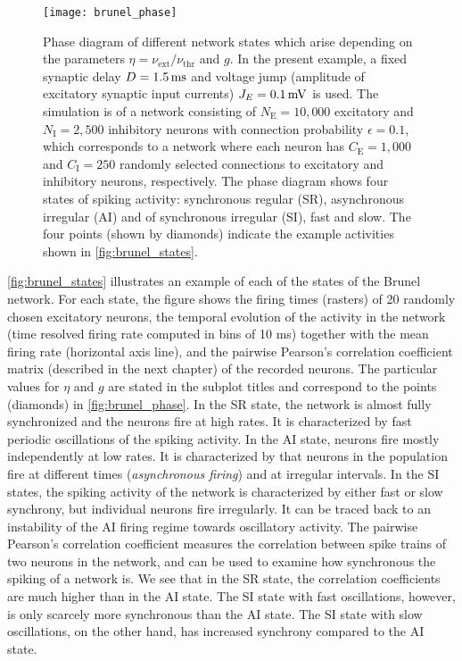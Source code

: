 \begin{figure}[!htb]
    \centering
    \texttt{[image: brunel\_phase]}
    \caption{Phase diagram of different network states which arise depending on the parameters $\eta = \nu_\mathrm{ext}/\nu_\mathrm{thr}$ and $g$. In the present example, a fixed synaptic delay $D=1.5\,\mathrm{ms}$ and voltage jump (amplitude of excitatory synaptic input currents)  $J_E = 0.1 \,\mathrm{mV}$ is used. The simulation is of a network consisting of $N_\mathrm{E}=10,000$ excitatory and $N_\mathrm{I} = 2,500$ inhibitory neurons with connection probability $\epsilon = 0.1$, which corresponds to a network where each neuron has $C_\mathrm{E}=1,000$ and $C_\mathrm{I}=250$ randomly selected connections to excitatory and inhibitory neurons, respectively. The phase diagram shows four states of spiking activity: synchronous regular (SR), asynchronous irregular (AI) and of synchronous irregular (SI), fast and slow. The four points (shown by diamonds) indicate the example activities shown in \autoref{fig:brunel_states}.
    }
    \label{fig:brunel_phase}
\end{figure}

\autoref{fig:brunel_states} illustrates an example of each of the states of the Brunel network. For each state, the figure shows the firing times (rasters) of 20 randomly chosen excitatory neurons, the temporal evolution of the activity in the network (time resolved firing rate computed in bins of 10 ms) together with the mean firing rate (horizontal axis line), and the pairwise Pearson's correlation coefficient matrix (described in the next chapter) of the recorded neurons. The particular values for $\eta$ and $g$ are stated in the subplot titles and correspond to the points (diamonds) in \autoref{fig:brunel_phase}. In the SR state, the network is almost fully synchronized and the neurons fire at high rates. It is characterized by fast periodic oscillations of the spiking activity. In the AI state, neurons fire mostly independently at low rates. It is characterized by that neurons in the population fire at different times (\textit{asynchronous firing}) and at irregular intervals. In the SI states, the spiking activity of the network is characterized by either fast or slow synchrony, but individual neurons fire irregularly. It can be traced back to an instability of the AI firing regime towards oscillatory activity. The pairwise Pearson's correlation coefficient measures the correlation between spike trains of two neurons in the network, and can be used to examine how synchronous the spiking of a network is. We see that in the SR state, the correlation coefficients are much higher than in the AI state. The SI state with fast oscillations, however, is only scarcely more synchronous than the AI state. The SI state with slow oscillations, on the other hand, has increased synchrony compared to the AI state. 

